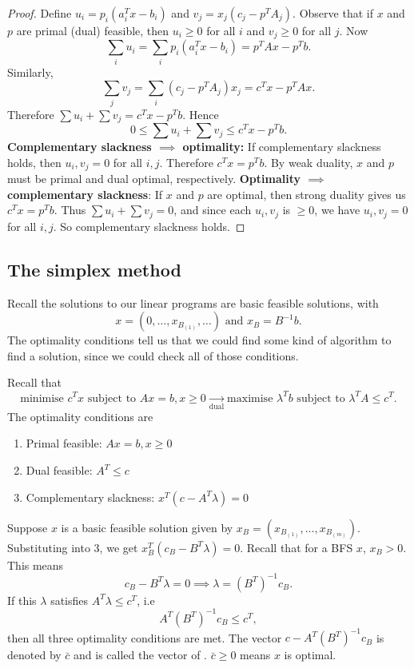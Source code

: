 \documentclass[egregdoesnotlikesansseriftitles,a4paper]{scrartcl}
\begin{document}
\begin{proof}
	 Define $u_i=p_i (a_i^T x - b_i)$ and $v_j=x_j(c_j-p^T A_j)$.\newline 
	 Observe that if $x$ and $p$ are primal (dual) feasible, then $u_i \geq 0$ for all $i$ and $v_j \geq 0$ for all $j$. Now 
	 \[\sum_{i}u_i=\sum_{i} p_i (a_i^T x - b_i) =p^T A x-p^T b.\]
	 Similarly,
	 \[\sum_{j}v_j=\sum_{i} (c_j-p^T A_j)x_j =c^Tx-p^T A x.\]
	 Therefore $\sum u_i+ \sum v_j=c^T x -p^T b$. Hence 
	 \[0 \leq \sum u_i+ \sum v_j \leq c^T x -p^T b.\]
	 \textbf{Complementary slackness $\implies $ optimality:}\newline 
	 If complementary slackness holds, then $u_i,v_j=0$ for all $i,j$. Therefore $c^T x=p^T b$. By weak duality, $x$ and $p$ must be primal and dual optimal, respectively.\newline 
	 \textbf{Optimality $\implies $ complementary slackness}:\newline 
	 If $x$ and $p$ are optimal, then strong duality gives us $c^T x =p^T b$. Thus $\sum u_i+ \sum v_j=0$, and since each $u_i,v_j$ is $\geq 0$, we have $u_i, v_j=0$ for all $i,j$. So complementary slackness holds.
\end{proof}

\subsection{The simplex method}
Recall the solutions to our linear programs are basic feasible solutions, with 
\[x=(0,\ldots,x_{B_{(1)}},\ldots) \text{ and } x_B =B^{-1}b.\]
The optimality conditions tell us that we could find some kind of algorithm to find a solution, since we could check all of those conditions.

Recall that 
\[\text{minimise }c^Tx \text{ subject to } Ax=b, x \geq 0 \underset{\text{dual} }{\to}  \text{maximise }\lambda^T b \text{ subject to } \lambda^TA \leq c^T.\]
The optimality conditions are 
\begin{enumerate}
	\item Primal feasible: $Ax=b, x \geq 0$
	\item Dual feasible: $A^T \leq c$
	\item Complementary slackness: $x^T (c-A^T \lambda)=0$
\end{enumerate}
Suppose $x$ is a basic feasible solution given by $x_B=(x_{B_{(1)}},\ldots ,x_{B_{(m)}})$. Substituting into 3, we get $x_B^T (c_B-B^T \lambda)=0$. Recall that for a BFS $x$, $x_B>0$. This means 
\[c_B-B^T\lambda=0 \implies \lambda={(B^T)}^{-1}c_B.\]
If this $\lambda$ satisfies $A^T \lambda \leq c^T$, i.e 
\[A^T {(B^T)}^{-1} c_B \leq c^T,\]
then all three optimality conditions are met. The vector $c-A^T {(B^T)}^{-1}c_B$ is denoted by $\bar{c}$ and is called the vector of . $\bar{c} \geq 0$ means $x$ is optimal.
\end{document}
